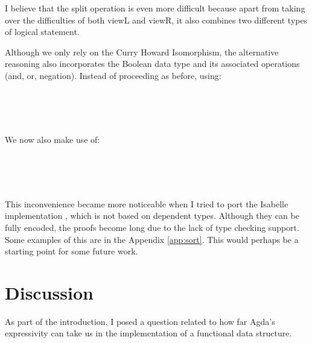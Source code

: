 \documentclass[12pt,twoside,notitlepage]{report}
\begin{document}
I believe that the split operation is even more difficult because apart from taking over the difficulties of both viewL and viewR, it also combines two different types of logical statement. 

Although we only rely on the Curry Howard Isomorphism, the alternative reasoning also incorporates the Boolean data type and its associated operations (and, or, negation). Instead of proceeding as before, using: 
 
\begin{code}
\\
\>[0]\<[2]%
\>[2] \AgdaSymbol{:}     \<%
\\
\>[0]\<[2]%
\>[2] \AgdaSymbol{:}    \AgdaSymbol{(}   \AgdaSymbol{)}\<%
\\
\end{code} 

We now also make use of: 

\begin{code}
\\
\>[0]\<[2]%
\>[2] \AgdaSymbol{:}    \AgdaSymbol{(}   \AgdaSymbol{)}\<%
\\
\>[0]\<[2]%
\>[2] \AgdaSymbol{:}    \AgdaSymbol{(}   \AgdaSymbol{)}\<%
\\
\end{code}

This inconvenience became more noticeable when I tried to port the Isabelle implementation \cite{isabelle}, which is not based on dependent types. Although they can be fully encoded, the proofs become long due to the lack of type checking support. Some examples of this are in the Appendix \ref{app:sort}. This would perhaps be a starting point for some future work.

\section{Discussion}

As part of the introduction, I posed a question related to how far Agda's expressivity can take us in the implementation of a functional data structure.
\end{document}
